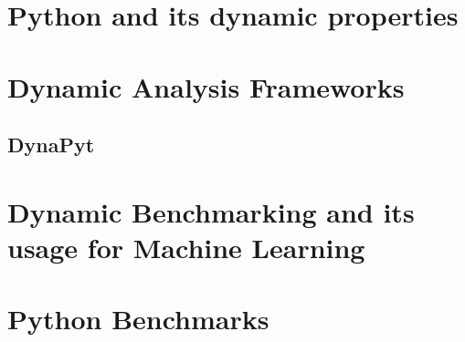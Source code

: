\section{Python and its dynamic properties}
\section{Dynamic Analysis Frameworks}
\subsection{DynaPyt}
\section{Dynamic Benchmarking and its usage for Machine Learning}
\section{Python Benchmarks}
